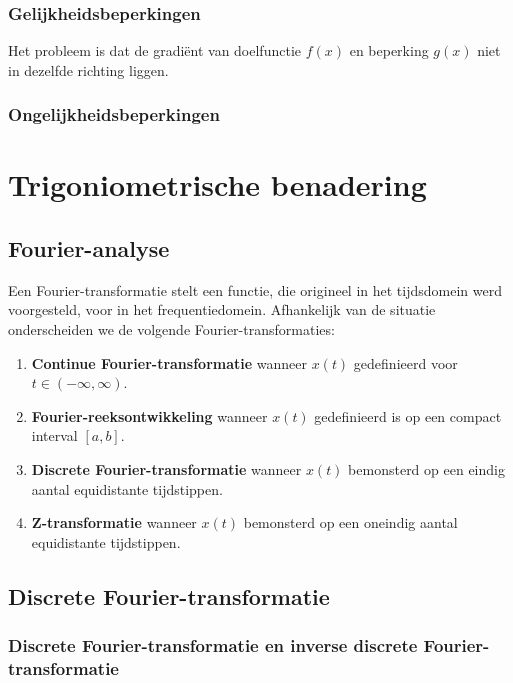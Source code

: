 \documentclass{article}
\begin{document}
	\subsubsection{Gelijkheidsbeperkingen}
	
	Het probleem is dat de gradiënt van doelfunctie $f(x)$ en beperking $g(x)$ niet in dezelfde richting liggen.\\
	
	
	\subsubsection{Ongelijkheidsbeperkingen}
	
	
	\section{Trigoniometrische benadering}
	
	\subsection{Fourier-analyse}
	Een Fourier-transformatie stelt een functie, die origineel in het tijdsdomein werd voorgesteld, voor in het frequentiedomein. Afhankelijk van de situatie onderscheiden we de volgende Fourier-transformaties:
		\begin{enumerate}
			\item \textbf{Continue Fourier-transformatie} wanneer $x(t)$ gedefinieerd voor $t \in (-\infty, \infty)$.
			\item \textbf{Fourier-reeksontwikkeling} wanneer $x(t)$ gedefinieerd is op een compact interval $[a, b]$.
			\item \textbf{Discrete Fourier-transformatie} wanneer $x(t)$ bemonsterd op een eindig aantal equidistante tijdstippen.
			\item \textbf{Z-transformatie} wanneer $x(t)$ bemonsterd op een oneindig aantal equidistante tijdstippen.
		\end{enumerate}	
	
	\subsection{Discrete Fourier-transformatie}
	
	\subsubsection{Discrete Fourier-transformatie en inverse discrete Fourier-transformatie}
	
\end{document}
